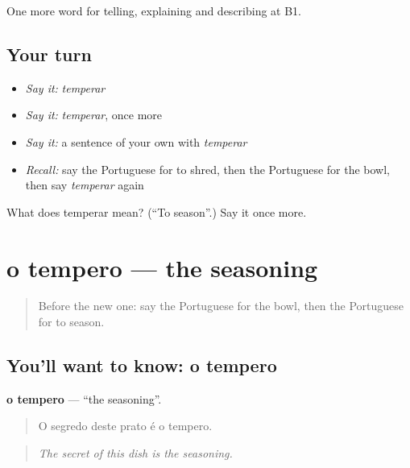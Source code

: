 \begin{grammarlens}[title={What you've built}]
One more word for telling, explaining and describing at B1.
\end{grammarlens}

\subsection*{Your turn}
\begin{itemize}
\raggedright
  \item \emph{Say it:} \emph{temperar}
  \item \emph{Say it:} \emph{temperar}, once more
  \item \emph{Say it:} a sentence of your own with \emph{temperar}
  \item \emph{Recall:} say the Portuguese for to shred, then the Portuguese for the bowl, then say \emph{temperar} again
\end{itemize}

\begin{tcolorbox}[breakable,colback=teal!4,colframe=teal!35!black,title={Before you move on}]
What does temperar mean? (\textquotedblleft{}To season\textquotedblright{}.) Say it once more.
\end{tcolorbox}
\section[o tempero]{o tempero — the seasoning}

\label{lesson:PT-C331-tempero}



\begin{quote}
Before the new one: say the Portuguese for the bowl, then the Portuguese for to season.
\end{quote}

\subsection*{You'll want to know: o tempero}
\textbf{o tempero} — \textquotedblleft{}the seasoning\textquotedblright{}.

\begin{quote}
O segredo deste prato é o tempero.
\end{quote}

\begin{quote}
\emph{The secret of this dish is the seasoning.}
\end{quote}

